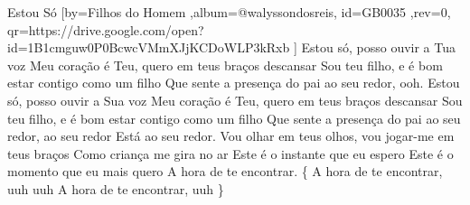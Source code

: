 \beginsong
{Estou Só %
}[by={Filhos do Homem %
},album={@walyssondosreis},
id={GB0035 %
},rev={0}, %
qr={https://drive.google.com/open?id=1B1cmguw0P0BcwcVMmXJjKCDoWLP3kRxb %
}]
\beginverse*
Estou só, posso ouvir a Tua voz
Meu coração é Teu, quero em teus braços descansar
Sou teu filho, e é bom estar contigo como um filho
Que sente a presença do pai ao seu redor, ooh.
\endverse
\beginverse*
Estou só, posso ouvir a Sua voz
Meu coração é Teu, quero em teus braços descansar
Sou teu filho, e é bom estar contigo como um filho
Que sente a presença do pai ao seu redor, ao seu redor
Está ao seu redor.
\endverse
\beginchorus
Vou olhar em teus olhos, vou jogar-me em teus braços
Como criança me gira no ar
Este é o instante que eu espero
Este é o momento que eu mais quero
A hora de te encontrar.
\{ A hora de te encontrar, uuh uuh
A hora de te encontrar, uuh \}
\endchorus
\vspace{4em} %
\begin{comment}
\lstset{basicstyle=\scriptsize\bf} %
\tab{Solo 1}
\begin{lstlisting}
E|-----------------------------------------------------|
B|-----------------------------------------------------|
G|-----------------------------------------------------|
D|-----------------------------------------------------|
A|-----------------------------------------------------|
E|-----------------------------------------------------|
\end{lstlisting}
\end{comment}
 
